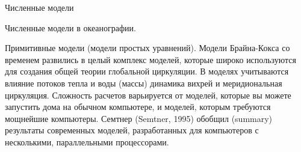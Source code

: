 \begin{chapter}{Численные модели}
\begin{section}{Численные модели в океанографии.}
\end{section}

\begin{section}{Примитивные модели (модели простых уравнений).}
Модели Брайна-Кокса со временем развились в целый комплекс моделей,
которые широко используются для создания общей теории глобальной
циркуляции. В моделях учитываются влияние потоков тепла и воды (массы)
динамика вихрей и меридиональная циркуляция. Сложность расчетов
варьируется от моделей, которые вы можете запустить дома на обычном
компьютере, и моделей, которым требуются мощнейшие компьютеры. Семтнер
(Semtner, 1995) обобщил (summary) результаты современных моделей,
разработанных для компьютеров с несколькими, параллельными
процессорами.


\end{section}
\end{chapter}
